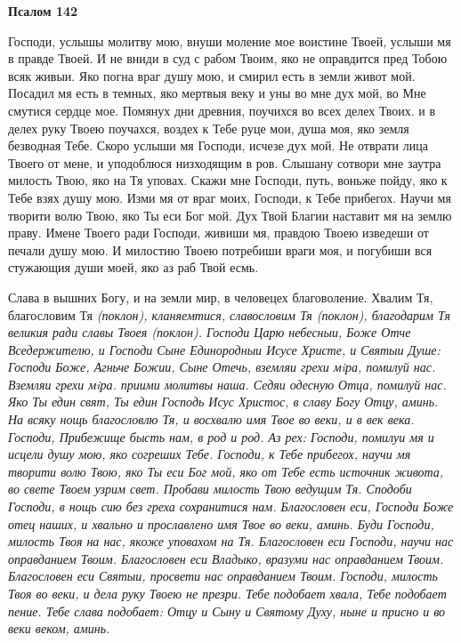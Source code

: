 \bfseries Псалом 142\normalfont{}


Господи, услышы молитву мою, внуши моление мое воистине Твоей, услыши мя в правде Твоей. И не вниди в суд с рабом Твоим, яко не оправдится пред Тобою всяк живыи. Яко погна враг душу мою, и смирил есть в земли живот мой. Посадил мя есть в темных, яко мертвыя веку и уны во мне дух мой, во Мне смутися сердце мое. Помянух дни древния, поучихся во всех делех Твоих. и в делех руку Твоею поучахся, воздех к Тебе руце мои, душа моя, яко земля безводная Тебе. Скоро услыши мя Господи, исчезе дух мой. Не отврати лица Твоего от мене, и уподоблюся низходящим в ров. Слышану сотвори мне заутра милость Твою, яко на Тя уповах. Скажи мне Господи, путь, воньже пойду, яко к Тебе взях душу мою. Изми мя от враг моих, Господи, к Тебе прибегох. Научи мя творити волю Твою, яко Ты еси Бог мой. Дух Твой Благии наставит мя на землю праву. Имене Твоего ради Господи, живиши мя, правдою Твоею изведеши от печали душу мою. И милостию Твоею потребиши враги моя, и погубиши вся стужающия души моей, яко аз раб Твой есмь.


Слава в вышних Богу, и на земли мир, в человецех благоволение. Хвалим Тя, благословим Тя \itshape (поклон)\normalfont{}, кланяемтися, славословим Тя \itshape (поклон)\normalfont{}, благодарим Тя великия ради славы Твоея \itshape (поклон)\normalfont{}. Господи Царю небесныи, Боже Отче Вседержителю, и Господи Сыне Единородныи Исусе Христе, и Святыи Душе: Господи Боже, Агньче Божии, Сыне Отечь, вземляи грехи мiра, помилуй нас. Вземляи грехи мiра. приими молитвы наша. Седяи одесную Отца, помилуй нас. Яко Ты един свят, Ты един Господь Исус Христос, в славу Богу Отцу, аминь. На всяку нощь благословлю Тя, и восхвалю имя Твое во веки, и в век века. Господи, Прибежище бысть нам, в род и род. Аз рех: Господи, помилуи мя и исцели душу мою, яко согреших Тебе. Господи, к Тебе прибегох, научи мя творити волю Твою, яко Ты еси Бог мой, яко от Тебе есть источник живота, во свете Твоем узрим свет. Пробави милость Твою ведущим Тя. Сподоби Господи, в нощь сию без греха сохранитися нам. Благословен еси, Господи Боже отец наших, и хвально и прославлено имя Твое во веки, аминь. Буди Господи, милость Твоя на нас, якоже уповахом на Тя. Благословен еси Господи, научи нас оправданием Твоим. Благословен еси Владыко, вразуми нас оправданием Твоим. Благословен еси Святыи, просвети нас оправданием Твоим. Господи, милость Твоя во веки, и дела руку Твоею не презри. Тебе подобает хвала, Тебе подобает пение. Тебе слава подобает: Отцу и Сыну и Святому Духу, ныне и присно и во веки веком, аминь.



